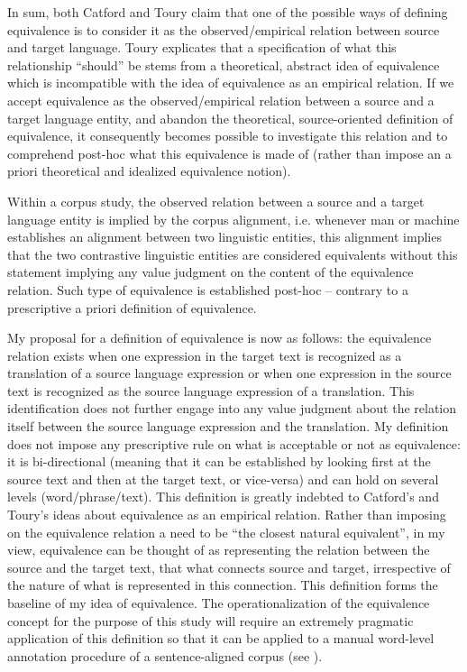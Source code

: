 In sum, both Catford and Toury claim that one of the possible ways of defining equivalence is to consider it as the observed\slash empirical relation between source and target language. Toury explicates that a specification of what this relationship ``should'' be stems from a theoretical, abstract idea of equivalence which is incompatible with the idea of equivalence as an empirical relation. If we accept equivalence as the observed\slash empirical relation between a source and a target language entity, and abandon the theoretical, source-oriented definition of equivalence, it consequently becomes possible to investigate this relation and to comprehend post-hoc what this equivalence is made of (rather than impose an a priori theoretical and idealized equivalence notion).

Within a corpus study, the observed relation between a source and a target language entity is implied by the corpus alignment, i.e. whenever man or machine establishes an alignment between two linguistic entities, this alignment implies that the two contrastive linguistic entities are considered equivalents without this statement implying any value judgment on the content of the equivalence relation. Such type of equivalence is established post-hoc -- contrary to a prescriptive a priori definition of equivalence.

My proposal for a definition of equivalence is now as follows: the equivalence relation exists when one expression in the target text is recognized as a translation of a source language expression or when one expression in the source text is recognized as the source language expression of a translation. This identification does not further engage into any value judgment about the relation itself between the source language expression and the translation. My definition does not impose any prescriptive rule on what is acceptable or not as equivalence: it is bi-directional (meaning that it can be established by looking first at the source text and then at the target text, or vice-versa) and can hold on several levels (word\slash phrase/text). This definition is greatly indebted to Catford’s and Toury’s ideas about equivalence as an empirical relation. Rather than imposing on the equivalence relation a need to be “the closest natural equivalent”, in my view, equivalence can be thought of as representing the relation between the source and the target text, that what connects source and target, irrespective of the nature of what is represented in this connection. This definition forms the baseline of my idea of equivalence. The operationalization of the equivalence concept for the purpose of this study will require an extremely pragmatic application of this definition so that it can be applied to a manual word-level annotation procedure of a sentence-aligned corpus (see ).

